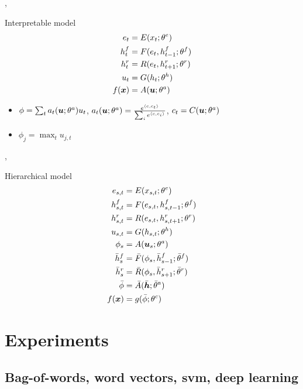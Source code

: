 \begin{frame}{\maxi, \softmaxi}
  \begin{block}{Interpretable model}
    \begin{align*}
  e_t &= E(x_t;\theta^e)\\
  h^f_t &= F(e_t,h^f_{t-1};\theta^f)\\
  h^r_t &= R(e_t,h^r_{t+1};\theta^r)\\
  u_t &= G(h_t;\theta^h)\\
  f(\bm{x}) &= A(\bm{u};\theta^a)
\end{align*}
  \end{block}
  \begin{itemize}
  \item
    $\phi = \sum_t a_t(\bm{u};\theta^a) u_t$, $a_t(\bm{u};\theta^a) = \frac{e^{\langle c, c_t\rangle}}
    {\sum_i{e^{\langle c, c_i\rangle}}}$, $c_t=C(\bm{u};\theta^a)$
\item $\phi_j = \max_t u_{j,t}$
\end{itemize}
\end{frame}

\begin{frame}{\maxh, \softmaxh}
  \begin{block}{Hierarchical model}
    \begin{align*}
  e_{s,t} &= E(x_{s,t};\theta^e)\\
  h^f_{s,t} &= F(e_{s,t},h^f_{s,t-1};\theta^{f})\\
  h^r_{s,t} &= R(e_{s,t},h^r_{s,t+1};\theta^{r})\\
  u_{s,t} &= G(h_{s,t};\theta^{h})\\
  \phi_s &= A(\bm{u}_s;\theta^{a})\\
  \bar{h}^{f}_{s} &= \bar{F}(\phi_{s},\bar{h}^{f}_{s-1};\bar{\theta}^{f})\\
  \bar{h}^{r}_{s} &= \bar{R}(\phi_{s},\bar{h}^{r}_{s+1};\bar{\theta}^{r})\\
  \bar{\phi} &= \bar{A}(\bar{\bm{h}};\bar{\theta}^{a})\\
  f(\bm{x}) &= g(\bar{\phi};\theta^c)
\end{align*}
  \end{block}
\end{frame}


\section{Experiments}

\subsection{Bag-of-words, word vectors, \acs{svm}, deep learning}

